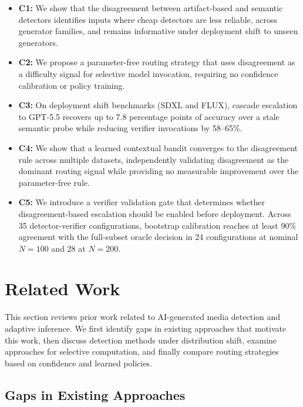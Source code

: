 \documentclass{ieeeaccess}
\begin{document}
\begin{itemize}
    \item \textbf{C1:} We show that the disagreement between artifact-based and semantic detectors identifies inputs where cheap detectors are less reliable, across generator families, and remains informative under deployment shift to unseen generators.
    
    \item \textbf{C2:} We propose a parameter-free routing strategy that uses disagreement as a difficulty signal for selective model invocation, requiring no confidence
    calibration or policy training.
    
    \item \textbf{C3:} On deployment shift benchmarks (SDXL and FLUX), cascade escalation to GPT-5.5 recovers up to 7.8 percentage points of accuracy over a stale semantic probe while reducing verifier invocations by 58--65\%.
    
    \item \textbf{C4:} We show that a learned contextual bandit converges to the disagreement rule across multiple datasets, independently validating disagreement as the dominant routing signal while providing no measurable improvement over the parameter-free rule.

    \item \textbf{C5:} We introduce a verifier validation gate that determines whether disagreement-based escalation should be enabled before deployment. Across 35 detector-verifier configurations, bootstrap calibration reaches at least 90\% agreement with the full-subset oracle decision in 24 configurations at nominal $N=100$ and 28 at $N=200$.
\end{itemize}


\section{Related Work}
This section reviews prior work related to AI-generated media detection and adaptive inference. We first identify gaps in existing approaches that motivate this work, then discuss detection methods under distribution shift, examine approaches for selective computation, and finally compare routing strategies based on confidence and learned policies.




\subsection{Gaps in Existing Approaches}
\end{document}
